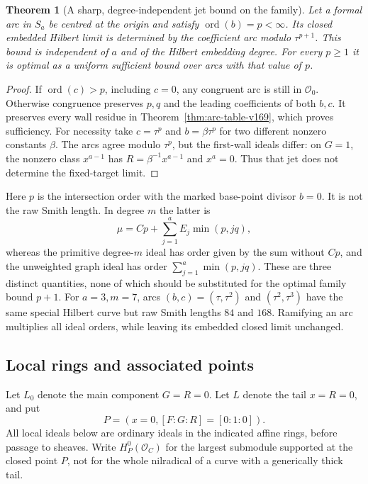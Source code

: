 \documentclass[11pt,reqno]{amsart}
\numberwithin{equation}{section}
\newtheorem{theorem}{Theorem}[section]
\theoremstyle{definition}\newtheorem{definition}[theorem]{Definition}
\theoremstyle{remark}\newtheorem{remark}[theorem]{Remark}
\newcommand{\OO}{\mathcal O}\newcommand{\II}{\mathcal I}
\begin{document}
\begin{theorem}[A sharp, degree-independent jet bound on the family]
\label{thm:sharp-jet-v169}
Let a formal arc in $S_a$ be centred at the origin and satisfy
$\operatorname{ord}(b)=p<\infty$. Its closed embedded Hilbert limit is
determined by the coefficient arc modulo $\tau^{p+1}$. This bound
is independent of $a$ and of the Hilbert embedding degree. For every
$p\geq1$ it is optimal as a uniform sufficient bound over arcs with
that value of $p$.
\end{theorem}
\begin{proof}
If $\operatorname{ord}(c)>p$, including $c=0$, any congruent arc is
still in $\mathcal O_0$. Otherwise congruence preserves $p,q$ and the
leading coefficients of both $b,c$. It preserves every wall residue
in Theorem~\ref{thm:arc-table-v169}, which proves sufficiency.
For necessity take $c=\tau^p$ and $b=\beta\tau^p$ for two different
nonzero constants $\beta$. The arcs agree modulo $\tau^p$, but the
first-wall ideals differ: on $G=1$, the nonzero class $x^{a-1}$ has
$R=\beta^{-1}x^{a-1}$ and $x^a=0$. Thus that jet does not determine
the fixed-target limit.
\end{proof}
Here $p$ is the intersection order with the marked base-point divisor
$b=0$. It is not the raw Smith length. In degree $m$ the latter is
\begin{equation}\label{eq:raw-order-v169}
 \mu=Cp+\sum_{j=1}^aE_j\min(p,jq),
\end{equation}
whereas the primitive degree-$m$ ideal has order given by the sum
without $Cp$, and the unweighted graph ideal has order
$\sum_{j=1}^a\min(p,jq)$. These are three distinct quantities, none
of which should be substituted for the optimal family bound $p+1$.
For $a=3,m=7$, arcs $(b,c)=(\tau,\tau^2)$ and
$(\tau^2,\tau^3)$ have the same special Hilbert curve but raw Smith
lengths $84$ and $168$. Ramifying an arc multiplies all ideal orders,
while leaving its embedded closed limit unchanged.

\subsection{Local rings and associated points}
Let $L_0$ denote the main component $G=R=0$. Let $L$ denote the tail
$x=R=0$, and put
\[
 P=(x=0,[F:G:R]=[0:1:0]).
\]
All local ideals below are ordinary ideals in the indicated affine
rings, before passage to sheaves. Write $H^0_P(\OO_C)$ for the
largest submodule supported at the closed point $P$, not for the
whole nilradical of a curve with a generically thick tail.
\end{document}
